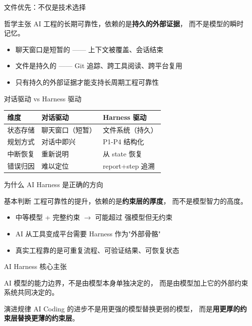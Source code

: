 \documentclass[theme=workflow,aspectratio=169,fontset=tech]{Hypo-Slide}
\begin{document}
\begin{frame}{文件优先：不仅是技术选择}
  \begin{block}{哲学主张}
    AI 工程的长期可靠性，依赖的是\textbf{持久的外部证据}，
    而不是模型的瞬时记忆。
  \end{block}
  \begin{itemize}
    \item 聊天窗口是短暂的 —— 上下文被覆盖、会话结束
    \item 文件是持久的 —— Git 追踪、跨工具阅读、跨平台复用
    \item 只有持久的外部证据才能支持长周期工程可靠性
  \end{itemize}
\end{frame}

\begin{frame}{对话驱动 vs Harness 驱动}
  \centering
  \begin{tabularx}{0.9\textwidth}{lXX}
    \toprule
    维度 & 对话驱动 & Harness 驱动 \\
    \midrule
    状态存储 & 聊天窗口（短暂）& 文件系统（持久）\\
    规划方式 & 对话中即兴 & P1-P4 结构化 \\
    中断恢复 & 重新说明 & 从 state 恢复 \\
    错误归因 & 难以定位 & report+step 追溯 \\
    \bottomrule
  \end{tabularx}
\end{frame}

\begin{frame}{为什么 AI Harness 是正确的方向}
  \begin{block}{基本判断}
    工程可靠性的提升，依赖的是\textbf{约束层的厚度}，
    而不是模型智力的高度。
  \end{block}
  \begin{itemize}
    \item 中等模型 + 完整约束 $\rightarrow$ 可能超过 强模型但无约束
    \item AI 从工具变成平台需要 Harness 作为"外部骨骼"
    \item 真实工程靠的是可重复流程、可验证结果、可恢复状态
  \end{itemize}
\end{frame}

\begin{frame}{AI Harness 核心主张}
  \begin{alertblock}{}
    AI 模型的能力边界，不是由模型本身单独决定的，
    而是由模型加上它的外部约束系统共同决定的。
  \end{alertblock}
  \vspace{0.3cm}
  \begin{block}{演进规律}
    AI Coding 的进步不是用更强的模型替换更弱的模型，
    而是\textbf{用更厚的约束层替换更薄的约束层}。
  \end{block}
\end{frame}
\end{document}
